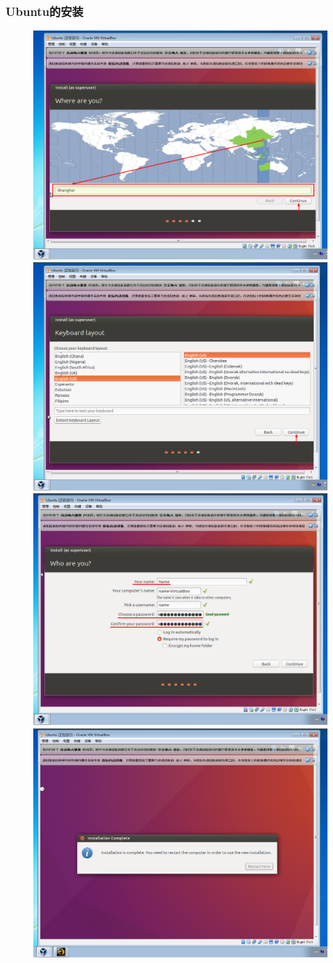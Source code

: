 \frame
{
	\frametitle{\textrm{Ubuntu}的安装}
\begin{figure}[h!]
\centering
\vspace{-12.5pt}
\includegraphics[height=0.37\textwidth]{Figures/Virtualbox-ubuntu-install-7.png}
\includegraphics[height=0.37\textwidth]{Figures/Virtualbox-ubuntu-install-8.png}
\includegraphics[height=0.37\textwidth]{Figures/Virtualbox-ubuntu-install-9.png}
\includegraphics[height=0.37\textwidth]{Figures/Virtualbox-ubuntu-install-10.png}
\caption{\textrm{\fontsize{6.2pt}{5.2pt}\selectfont{The install step-5 of Ubuntu in Virtualbox.}}}
\label{Virtualbox-ubuntu-install-4}
\end{figure}
}

